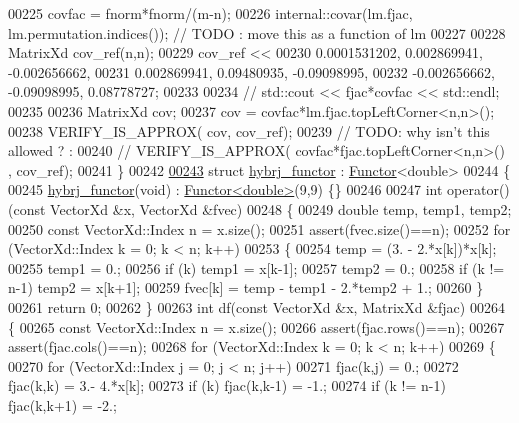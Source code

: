 \begin{DoxyCode}
00225   covfac = fnorm*fnorm/(m-n);
00226   internal::covar(lm.fjac, lm.permutation.indices()); \textcolor{comment}{// TODO : move this as a function of lm}
00227 
00228   MatrixXd cov\_ref(n,n);
00229   cov\_ref <<
00230       0.0001531202,   0.002869941,  -0.002656662,
00231       0.002869941,    0.09480935,   -0.09098995,
00232       -0.002656662,   -0.09098995,    0.08778727;
00233 
00234 \textcolor{comment}{//  std::cout << fjac*covfac << std::endl;}
00235 
00236   MatrixXd cov;
00237   cov =  covfac*lm.fjac.topLeftCorner<n,n>();
00238   VERIFY\_IS\_APPROX( cov, cov\_ref);
00239   \textcolor{comment}{// TODO: why isn't this allowed ? :}
00240   \textcolor{comment}{// VERIFY\_IS\_APPROX( covfac*fjac.topLeftCorner<n,n>() , cov\_ref);}
00241 \}
00242 
\hyperlink{structhybrj__functor}{00243} \textcolor{keyword}{struct }\hyperlink{structhybrj__functor}{hybrj\_functor} : \hyperlink{struct_functor}{Functor}<double>
00244 \{
00245     \hyperlink{structhybrj__functor}{hybrj\_functor}(\textcolor{keywordtype}{void}) : \hyperlink{struct_functor}{Functor<double>}(9,9) \{\}
00246 
00247     \textcolor{keywordtype}{int} operator()(\textcolor{keyword}{const} VectorXd &x, VectorXd &fvec)
00248     \{
00249         \textcolor{keywordtype}{double} temp, temp1, temp2;
00250         \textcolor{keyword}{const} VectorXd::Index n = x.size();
00251         assert(fvec.size()==n);
00252         \textcolor{keywordflow}{for} (VectorXd::Index k = 0; k < n; k++)
00253         \{
00254             temp = (3. - 2.*x[k])*x[k];
00255             temp1 = 0.;
00256             \textcolor{keywordflow}{if} (k) temp1 = x[k-1];
00257             temp2 = 0.;
00258             \textcolor{keywordflow}{if} (k != n-1) temp2 = x[k+1];
00259             fvec[k] = temp - temp1 - 2.*temp2 + 1.;
00260         \}
00261         \textcolor{keywordflow}{return} 0;
00262     \}
00263     \textcolor{keywordtype}{int} df(\textcolor{keyword}{const} VectorXd &x, MatrixXd &fjac)
00264     \{
00265         \textcolor{keyword}{const} VectorXd::Index n = x.size();
00266         assert(fjac.rows()==n);
00267         assert(fjac.cols()==n);
00268         \textcolor{keywordflow}{for} (VectorXd::Index k = 0; k < n; k++)
00269         \{
00270             \textcolor{keywordflow}{for} (VectorXd::Index j = 0; j < n; j++)
00271                 fjac(k,j) = 0.;
00272             fjac(k,k) = 3.- 4.*x[k];
00273             \textcolor{keywordflow}{if} (k) fjac(k,k-1) = -1.;
00274             \textcolor{keywordflow}{if} (k != n-1) fjac(k,k+1) = -2.;

\end{DoxyCode}
